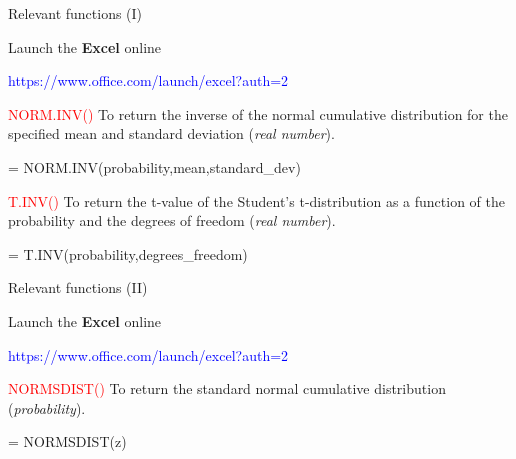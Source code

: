\documentclass[
  11pt,
  ignorenonframetext,
]{beamer}
\newenvironment{Shaded}{\begin{snugshade}}{\end{snugshade}}
\newcommand{\NormalTok}[1]{#1}
\begin{document}
\begin{frame}[fragile]{Relevant functions (I)}
\protect\hypertarget{relevant-functions-i}{}
\normalsize

Launch the \textbf{Excel} online

\footnotesize

\textcolor{blue}{https://www.office.com/launch/excel?auth=2}

\vspace{3mm}

\normalsize

\textcolor{red}{NORM.INV()} \footnotesize To return the inverse of the
normal cumulative distribution for the specified mean and standard
deviation (\emph{real number}).

\begin{Shaded}
\begin{Highlighting}[]
\NormalTok{= NORM.INV(probability,mean,standard\_dev)}
\end{Highlighting}
\end{Shaded}

\normalsize

\textcolor{red}{T.INV()} \footnotesize To return the t-value of the
Student's t-distribution as a function of the probability and the
degrees of freedom (\emph{real number}).

\begin{Shaded}
\begin{Highlighting}[]
\NormalTok{= T.INV(probability,degrees\_freedom)}
\end{Highlighting}
\end{Shaded}
\end{frame}

\begin{frame}[fragile]{Relevant functions (II)}
\protect\hypertarget{relevant-functions-ii}{}
\normalsize

Launch the \textbf{Excel} online

\footnotesize

\textcolor{blue}{https://www.office.com/launch/excel?auth=2}

\vspace{3mm}

\normalsize

\textcolor{red}{NORMSDIST()} \footnotesize To return the standard normal
cumulative distribution (\emph{probability}).

\begin{Shaded}
\begin{Highlighting}[]
\NormalTok{= NORMSDIST(z)}
\end{Highlighting}
\end{Shaded}
\end{frame}
\end{document}
